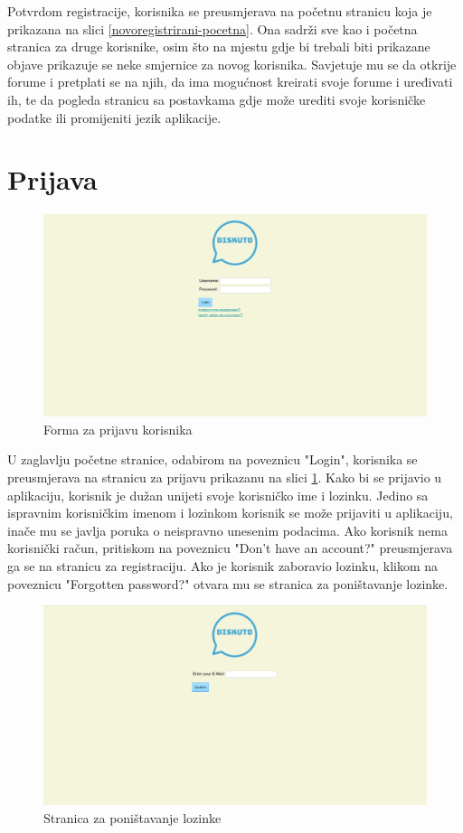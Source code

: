 \documentclass{foi}
\begin{document}
Potvrdom registracije, korisnika se preusmjerava na početnu stranicu koja je prikazana na slici \ref{novoregistrirani-pocetna}. Ona sadrži sve kao i početna stranica za druge korisnike, osim što na mjestu gdje bi trebali biti prikazane objave prikazuje se neke smjernice za novog korisnika. Savjetuje mu se da otkrije forume i pretplati se na njih, da ima mogućnost kreirati svoje forume i uređivati ih, te da pogleda stranicu sa postavkama gdje može urediti svoje korisničke podatke ili promijeniti jezik aplikacije.

\section{Prijava}

\begin{figure}[h!]
    \centering
    \includegraphics[width=1\textwidth]{slike/prijava.png}
    \caption{Forma za prijavu korisnika}
    \label{prijava}
\end{figure}

U zaglavlju početne stranice, odabirom na poveznicu "Login", korisnika se preusmjerava na stranicu za prijavu prikazanu na slici \ref{prijava}. Kako bi se prijavio u aplikaciju, korisnik je dužan unijeti svoje korisničko ime i lozinku. Jedino sa ispravnim korisničkim imenom i lozinkom korisnik se može prijaviti u aplikaciju, inače mu se javlja poruka o neispravno unesenim podacima. Ako korisnik nema korisnički račun, pritiskom na poveznicu "Don't have an account?" preusmjerava ga se na stranicu za registraciju. Ako je korisnik zaboravio lozinku, klikom na poveznicu "Forgotten password?" otvara mu se stranica za poništavanje lozinke.

\begin{figure}[h!]
    \centering
    \includegraphics[width=1\textwidth]{slike/zaboravljena-lozinka.png}
    \caption{Stranica za poništavanje lozinke}
\end{figure}
\end{document}
